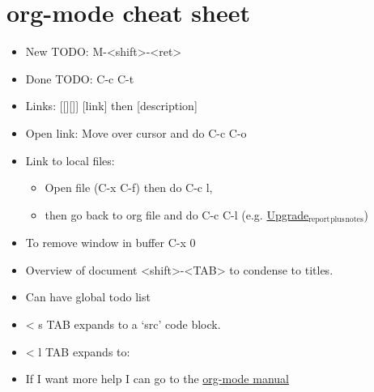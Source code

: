 \documentclass[11pt]{article}
\begin{document}
\section{org-mode cheat sheet}
\label{sec-5}
\begin{itemize}
\item New TODO: M-<shift>-<ret>
\item Done TODO: C-c C-t
\item Links: [[][]] [link] then [description]
\item Open link: Move over cursor and do C-c C-o
\item Link to local files:
\begin{itemize}
\item Open file (C-x C-f) then do C-c l,
\item then go back to org file and do C-c C-l (e.g. \href{file:///home/tigany/Documents/docs/PhDPaperSummary/upgrade_rep_plus_notes.tex}{Upgrade$_{\text{report}}$$_{\text{plus}}$$_{\text{notes}}$})
\end{itemize}
\item To remove window in buffer C-x 0
\item Overview of document <shift>-<TAB> to condense to titles.
\item Can have global todo list
\item < s TAB expands to a ‘src’ code block.
\item < l TAB expands to:
\end{itemize}
\begin{export}
\end{export}


\begin{itemize}
\item If I want more help I can go to the \href{https://orgmode.org/manual/}{org-mode manual}
\end{itemize}






\end{document}
